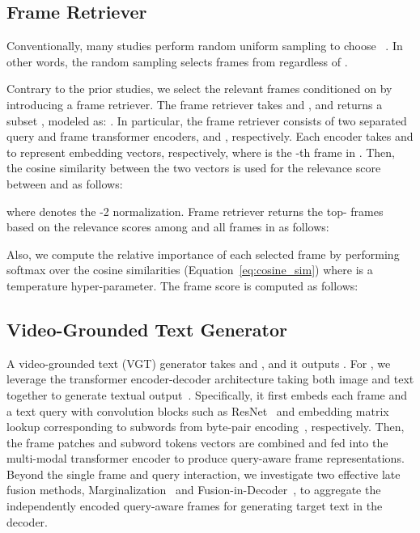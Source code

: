 \documentclass{article}
\begin{document}
\subsection{Frame Retriever}

Conventionally, many studies perform random uniform sampling to choose ~\cite{lei2021less,zellers2021merlot, wang2022all,yang2022zero}. In other words, the random sampling selects  frames from  regardless of .




Contrary to the prior studies, we select the relevant frames conditioned on  by introducing a frame retriever. The frame retriever  takes  and , and returns a subset , modeled as: . In particular, the frame retriever consists of two separated query and frame transformer encoders,  and , respectively. Each encoder takes  and  to represent embedding vectors, respectively, where  is the -th frame in . Then, the cosine similarity between the two vectors is used for the relevance score between  and  as follows:

where  denotes the -2 normalization.
Frame retriever returns the top- frames based on the relevance scores among  and all frames in  as follows:


Also, we compute the relative importance of each selected frame  by performing softmax over the cosine similarities (Equation~\ref{eq:cosine_sim}) where  is a temperature hyper-parameter. The frame score is computed as follows:



\subsection{Video-Grounded Text Generator}

A video-grounded text (VGT) generator  takes  and , and it outputs . For , we leverage the transformer encoder-decoder architecture taking both image and text together to generate textual output~\cite{vaswani2017attention, wang2021simvlm, wang2022unifying}. Specifically, it first embeds each frame  and a text query  with convolution blocks such as ResNet~\cite{he2016deep} and embedding matrix lookup corresponding to subwords from byte-pair encoding~\cite{sennrich2015neural}, respectively. Then, the frame patches and subword tokens vectors are combined and fed into the multi-modal transformer encoder to produce  query-aware frame representations. Beyond the single frame and query interaction, we investigate two effective late fusion methods, Marginalization~\cite{lewis2020retrieval} and Fusion-in-Decoder~\cite{izacard2021leveraging}, to aggregate the independently encoded  query-aware frames for generating target text  in the decoder.
\end{document}
